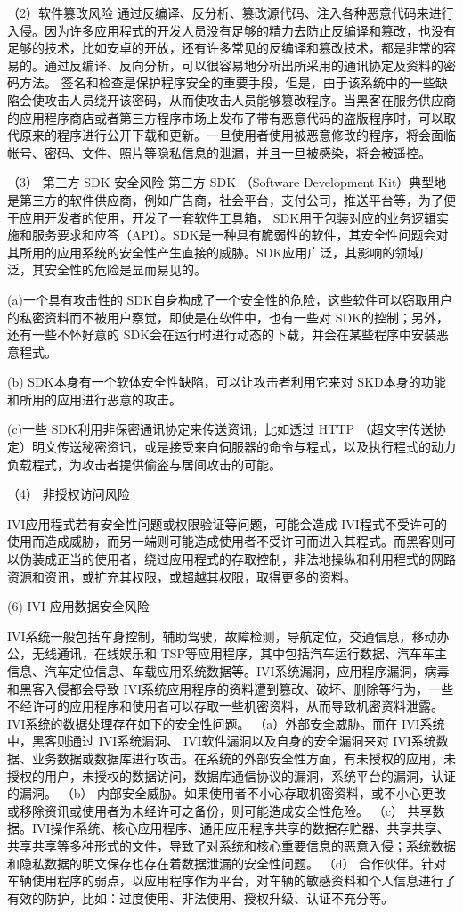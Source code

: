 （2）软件篡改风险 
通过反编译、反分析、篡改源代码、注入各种恶意代码来进行入侵。因为许多应用程式的开发人员没有足够的精力去防止反编译和篡改，也没有足够的技术，比如安卓的开放，还有许多常见的反编译和篡改技术，都是非常的容易的。通过反编译、反向分析，可以很容易地分析出所采用的通讯协定及资料的密码方法。
签名和检查是保护程序安全的重要手段，但是，由于该系统中的一些缺陷会使攻击人员绕开该密码，从而使攻击人员能够篡改程序。当黑客在服务供应商的应用程序商店或者第三方程序市场上发布了带有恶意代码的盗版程序时，可以取代原来的程序进行公开下载和更新。一旦使用者使用被恶意修改的程序，将会面临帐号、密码、文件、照片等隐私信息的泄漏，并且一旦被感染，将会被遥控。 

（3） 第三方 SDK 安全风险
第三方 SDK （Software Development Kit）典型地是第三方的软件供应商，例如广告商，社会平台，支付公司，推送平台等，为了便于应用开发者的使用，开发了一套软件工具箱， SDK用于包装对应的业务逻辑实施和服务要求和应答（API）。SDK是一种具有脆弱性的软件，其安全性问题会对其所用的应用系统的安全性产生直接的威胁。SDK应用广泛，其影响的领域广泛，其安全性的危险是显而易见的。 

(a)一个具有攻击性的 SDK自身构成了一个安全性的危险，这些软件可以窃取用户的私密资料而不被用户察觉，即使是在软件中，也有一些对 SDK的控制；另外，还有一些不怀好意的 SDK会在运行时进行动态的下载，并会在某些程序中安装恶意程式。

(b) SDK本身有一个软体安全性缺陷，可以让攻击者利用它来对 SKD本身的功能和所用的应用进行恶意的攻击。

(c)一些 SDK利用非保密通讯协定来传送资讯，比如透过 HTTP （超文字传送协定）明文传送秘密资讯，或是接受来自伺服器的命令与程式，以及执行程式的动力负载程式，为攻击者提供偷盗与居间攻击的可能。

（4） 非授权访问风险 

IVI应用程式若有安全性问题或权限验证等问题，可能会造成 IVI程式不受许可的使用而造成威胁，而另一端则可能造成使用者不受许可而进入其程式。而黑客则可以伪装成正当的使用者，绕过应用程式的存取控制，非法地操纵和利用程式的网路资源和资讯，或扩充其权限，或超越其权限，取得更多的资料。

(6) IVI 应用数据安全风险 

IVI系统一般包括车身控制，辅助驾驶，故障检测，导航定位，交通信息，移动办公，无线通讯，在线娱乐和 TSP等应用程序，其中包括汽车运行数据、汽车车主信息、汽车定位信息、车载应用系统数据等。IVI系统漏洞，应用程序漏洞，病毒和黑客入侵都会导致 IVI系统应用程序的资料遭到篡改、破坏、删除等行为，一些不经许可的应用程序和使用者可以存取一些机密资料，从而导致机密资料泄露。IVI系统的数据处理存在如下的安全性问题。
（a）外部安全威胁。而在 IVI系统中，黑客则通过 IVI系统漏洞、 IVI软件漏洞以及自身的安全漏洞来对 IVI系统数据、业务数据或数据库进行攻击。在系统的外部安全性方面，有未授权的应用，未授权的用户，未授权的数据访问，数据库通信协议的漏洞，系统平台的漏洞，认证的漏洞。 
（b） 内部安全威胁。如果使用者不小心存取机密资料，或不小心更改或移除资讯或使用者为未经许可之备份，则可能造成安全性危险。
（c） 共享数据。IVI操作系统、核心应用程序、通用应用程序共享的数据存贮器、共享共享、共享共享等多种形式的文件，导致了对系统和核心重要信息的恶意入侵；系统数据和隐私数据的明文保存也存在着数据泄漏的安全性问题。
（d） 合作伙伴。针对车辆使用程序的弱点，以应用程序作为平台，对车辆的敏感资料和个人信息进行了有效的防护，比如：过度使用、非法使用、授权升级、认证不充分等。 

